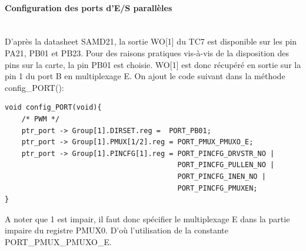 \documentclass[a4paper]{article}
\begin{document}
    \paragraph{Configuration des ports d'E/S parallèles} ~~\\
    D’après la datasheet SAMD21, la sortie WO[1] du TC7 est disponible sur les pin PA21, PB01 et PB23. Pour des raisons pratiques vis-à-vis de la disposition des pins sur la carte, la pin PB01 est choisie. WO[1] est donc récupéré en sortie sur la pin 1 du port B en multiplexage E. On ajout le code suivant dans la méthode config\_PORT():
\begin{lstlisting}[style=CStyle]
void config_PORT(void){
	/* PWM */
	ptr_port -> Group[1].DIRSET.reg =  PORT_PB01;
	ptr_port -> Group[1].PMUX[1/2].reg = PORT_PMUX_PMUXO_E;
	ptr_port -> Group[1].PINCFG[1].reg = PORT_PINCFG_DRVSTR_NO |
	                                     PORT_PINCFG_PULLEN_NO |
	                                     PORT_PINCFG_INEN_NO |
	                                     PORT_PINCFG_PMUXEN;
}
\end{lstlisting}
    A noter que 1 est impair, il faut donc spécifier le multiplexage E dans la partie impaire du registre PMUX0. D’où l’utilisation de la constante PORT\_PMUX\_PMUXO\_E. 
\end{document}
